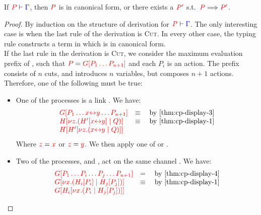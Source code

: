 \begin{theorem}[Progress]\label{thm:cp-progress}
  If $\seq[{ P }]{ \Gamma }$, then $\tm{P}$ is in canonical form, or there
  exists a $\tm{P'}$ s.t.\ $\reducesto{P}{P'}$. 
\end{theorem}
  \begin{proof}
    By induction on the structure of derivation for $\seq[{ P }]{ \Gamma }$.
    The only interesting case is when the last rule of the derivation is
    \textsc{Cut}. In every other case, the typing rule constructs a term in which
    is in canonical form. 
    \\
    If the last rule in the derivation is \textsc{Cut}, we consider the maximum
    evaluation prefix  of , such that $\tm{P} = \tm{\cpPlug{G}{P_1
        \dots P_{n+1}}}$ and each $P_i$ is an action.
    The prefix  consists of $n$ cuts, and introduces $n$ variables, but
    composes $n+1$ actions. Therefore, one of the following must be true:
    \begin{itemize}
    \item
      One of the processes is a link .
      We have:
      \begin{gather*}
        \begin{array}{ll}
          \tm{\cpPlug{G}{P_1 \dots \cpLink{x}{y} \dots P_{n+1}}}
          & \equiv \quad \text{by \cref{thm:cp-display-3}}
          \\
          \tm{\cpPlug{H}{\cpCut{z}{\cpPlug{H'}{\cpLink{x}{y}}}{Q}}}
          & \equiv \quad \text{by \cref{thm:cp-display-1}}
          \\
          \tm{\cpPlug{H}{\cpPlug{H'}{\cpCut{z}{\cpLink{x}{y}}{Q}}}}
        \end{array}
      \end{gather*}
      Where $\tm{z} = \tm{x}$ or $\tm{z} = \tm{y}$.
      We then apply one of  or .
    \item
      Two of the processes,  and , act on the same channel .
      We have:
      \begin{gather*}
        \begin{array}{ll}
          \tm{\cpPlug{G}{P_1 \dots P_i \dots P_j \dots P_{n+1}}}
          & = \quad \text{by \cref{thm:cp-display-4}}
          \\
          \tm{\cpPlug{G}{\cpCut{x}{\cpPlug{H_i}{P_i}}{\cpPlug{H_j}{P_j}}}}
          & \equiv \quad \text{by \cref{thm:cp-display-1}} 
          \\
          \tm{\cpPlug{G}{\cpPlug{H_i}{\cpCut{x}{P_i}{\cpPlug{H_j}{P_j}}}}}

\end{array}
\end{gather*}
\end{itemize}
\end{proof}
